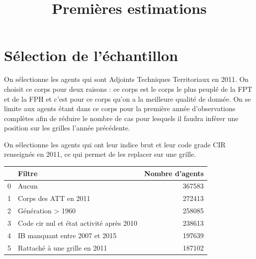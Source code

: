 \documentclass[11pt,a4paper]{article}
\begin{document}
\title{Premières estimations}


\author{}


\maketitle

\section{Sélection de l'échantillon}
On sélectionne les agents qui sont Adjoints Techniques Territoriaux en 2011. On choisit ce corps pour deux raisons : ce corps est le corps le plus peuplé de la FPT et de la FPH et c'est pour ce corps qu'on a la meilleure qualité de donnée. On se limite aux agents étant dans ce corps pour la première année d'observations complètes afin de réduire le nombre de cas pour lesquels il faudra inférer une position sur les grilles l'année précédente. \bigskip

On sélectionne les agents qui ont leur indice brut et leur code grade CIR renseignés en 2011, ce qui permet de les replacer sur une grille.
\begin{center}
	\begin{tabular}{llr}
		\toprule
		{} &                                         Filtre &       Nombre d'agents \\
		\midrule
		0 &                                     Aucun &  367583 \\
		1 &                     Corps des ATT en 2011 &  272413 \\
		2 &                         Génération > 1960 &  258085 \\
		3 &  Code cir nul et état activité après 2010 &  238613 \\
		4 &            IB manquant entre 2007 et 2015 &  197639 \\
		5 &             Rattaché à une grille en 2011 &  187102 \\
		\bottomrule
	\end{tabular}
\end{center}
\end{document}
